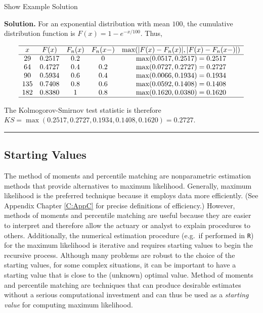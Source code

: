 \documentclass[]{book}
\theoremstyle{definition}
\theoremstyle{definition}
\theoremstyle{definition}
\theoremstyle{remark}
\begin{document}
Show Example Solution

\hypertarget{toggleExampleSelect.1.7}{}
\textbf{Solution.} For an exponential distribution with mean \(100\),
the cumulative distribution function is \(F(x)=1-e^{-x/100}\). Thus,

\[
\begin{array}{ccccc}
\hline
x & F(x) & F_n(x) & F_n(x-) & \max(|F(x)-F_n(x)|,|F(x)-F_n(x-)|) \\
\hline
29  & 0.2517 & 0.2 & 0   & \max(0.0517, 0.2517) = 0.2517 \\
64  & 0.4727 & 0.4 & 0.2 & \max(0.0727, 0.2727) = 0.2727 \\
90  & 0.5934 & 0.6 & 0.4 & \max(0.0066, 0.1934) = 0.1934 \\
135 & 0.7408 & 0.8 & 0.6 & \max(0.0592, 0.1408) = 0.1408 \\
182 & 0.8380 & 1   & 0.8 & \max(0.1620, 0.0380) = 0.1620 \\
\hline
\end{array}
\]

The Kolmogorov-Smirnov test statistic is therefore
\(KS = \max(0.2517, 0.2727, 0.1934, 0.1408, 0.1620) = 0.2727\).

\begin{center}\rule{0.5\linewidth}{\linethickness}\end{center}

\subsection{Starting Values}\label{starting-values}

The method of moments and percentile matching are nonparametric
estimation methods that provide alternatives to maximum likelihood.
Generally, maximum likelihood is the preferred technique because it
employs data more efficiently. (See Appendix Chapter \ref{C:AppC} for
precise definitions of efficiency.) However, methods of moments and
percentile matching are useful because they are easier to interpret and
therefore allow the actuary or analyst to explain procedures to others.
Additionally, the numerical estimation procedure (e.g.~if performed in
\texttt{R}) for the maximum likelihood is iterative and requires
starting values to begin the recursive process. Although many problems
are robust to the choice of the starting values, for some complex
situations, it can be important to have a starting value that is close
to the (unknown) optimal value. Method of moments and percentile
matching are techniques that can produce desirable estimates without a
serious computational investment and can thus be used as a
\emph{starting value} for computing maximum likelihood.
\end{document}
